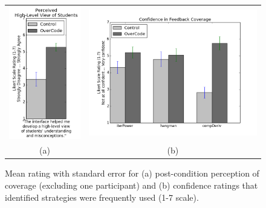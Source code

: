 \documentclass[12pt,twoside]{mitthesis}
\begin{document}
\begin{figure}[t!]
\begin{tabular}{c | c}
\begin{minipage}{.5\linewidth}
\centering
\includegraphics[scale=0.5]{Body/figures/overcode/highLevelViewStudy2.png}
\end{minipage}
&
\begin{minipage}{.5\linewidth}
\centering
\includegraphics[width=\linewidth]{Body/figures/overcode/coverageConfidence.png}
\end{minipage}
\\
(a) & (b)
\end{tabular}
\caption{Mean rating with standard error for (a) post-condition perception of coverage (excluding one participant) and (b) confidence ratings that identified strategies were frequently used (1-7 scale).}
\label{perceivedCoverage}
\end{figure}
\end{document}
